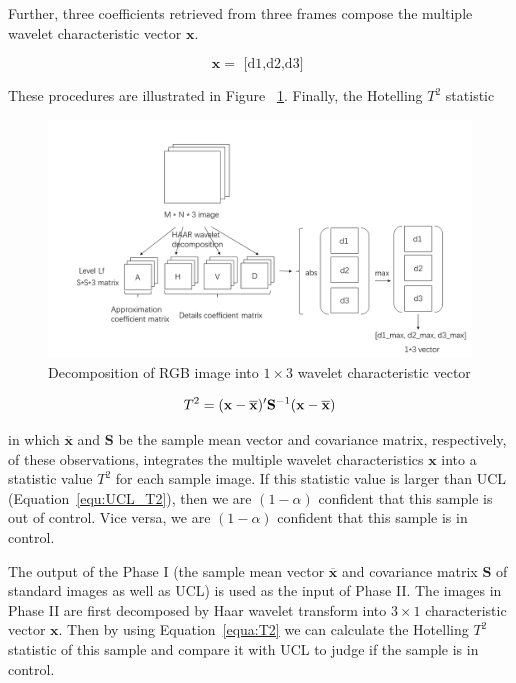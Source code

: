 Further, three coefficients retrieved from three frames compose the multiple wavelet characteristic vector $\mathbf{x}$. 

\begin{equation}
\mathbf{x}=\text { [d1,d2,d3] }
\end{equation}

These procedures are illustrated in Figure ~\ref{fig:dwt_procedure}. Finally, the Hotelling $T^{2}$ statistic

\begin{figure}[h]
\centering
\includegraphics[width=1\textwidth]{images/wavelet_process.png}
\caption{Decomposition of RGB image into $1\times3$ wavelet characteristic vector}
\label{fig:dwt_procedure}
\end{figure}


\begin{equation}
\centering T^{2}=(\mathbf{x}-\overline{\mathbf{x}})^{\prime} \mathbf{S}^{-1}(\mathbf{x}-\overline{\mathbf{x}}) \label{equa:T2}
\end{equation}

in which $\overline{\mathbf{x}}$ and $\mathbf{S}$ be the sample mean vector and
covariance matrix, respectively, of these observations,
integrates the multiple wavelet characteristics $\mathbf{x}$ into a statistic value $T^{2}$ for each sample image.
If this statistic value is larger than UCL (Equation~\ref{equ:UCL_T2}), then we are $(1 - \alpha)$ confident that this sample is out of control. Vice versa, we are $(1- \alpha)$ confident that this sample is in control.


The output of the Phase I (the sample mean vector $\overline{\mathbf{x}}$ and covariance matrix $\mathbf{S}$ of standard images as well as UCL) is used as the input of Phase II. The images in Phase II are first decomposed by Haar wavelet transform into $3 \times 1$ characteristic vector $\mathbf{x}$. Then by using Equation~\ref{equa:T2} we can calculate the Hotelling $T^{2}$ statistic of this sample and compare it with UCL to judge if the sample is in control.








